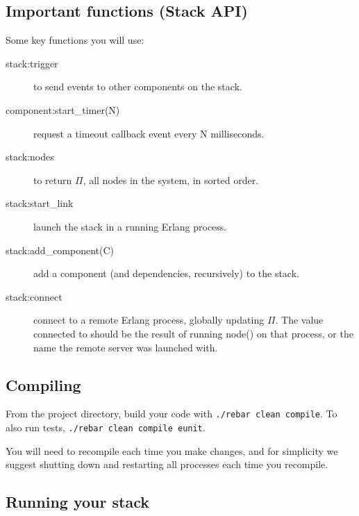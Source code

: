 \documentclass[a4paper]{article}
\begin{document}

\subsection{Important functions (Stack API)} %
\label{sub:api}

Some key functions you will use:

\begin{description}
  \item[stack:trigger] to send events to other components on the stack.
  \item[component:start\_timer(N)] request a timeout callback event every N milliseconds.
  \item[stack:nodes] to return $\Pi$, all nodes in the system, in sorted order.

  \item[stack:start\_link] launch the stack in a running Erlang process.

  \item[stack:add\_component(C)] add a component (and dependencies, recursively) to the
  stack.

  \item[stack:connect] connect to a remote Erlang process, globally updating $\Pi$.
      The value connected to should be the result of running node() on that process, or the name the remote server was launched with.
\end{description}



\subsection{Compiling} %
\label{sub:compiling_and_running_the_program}

From the project directory, build your code with \verb!./rebar clean compile!.
To also run tests, \verb!./rebar clean compile eunit!.

You will need to recompile each time you make changes, and for simplicity we
suggest shutting down and restarting all processes each time you recompile.

\subsection{Running your stack} %
\label{sub:running_your_stack}

\end{document}
